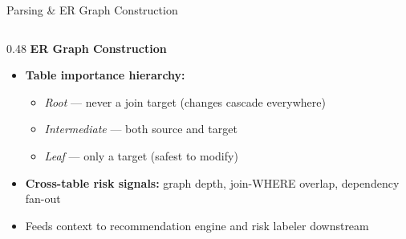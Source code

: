 \documentclass[10pt,aspectratio=169]{beamer}
\newcommand{\Raleway}{\sffamily}
\begin{document}
\begin{frame}{Parsing \& ER Graph Construction}
\begin{columns}[T]
    \begin{column}{0.48\textwidth}
      {\small\Raleway\bfseries\color{aggieblue} ER Graph Construction}\\[0.6em]
      \begin{itemize}
        \setlength{\itemsep}{0.6em}
        \item \textbf{Table importance hierarchy:}
          \begin{itemize}
            \setlength{\itemsep}{0.2em}
            \item \textit{Root} --- never a join target (changes cascade everywhere)
            \item \textit{Intermediate} --- both source and target
            \item \textit{Leaf} --- only a target (safest to modify)
          \end{itemize}
        \item \textbf{Cross-table risk signals:} graph depth, join-WHERE overlap, dependency fan-out
        \item Feeds context to recommendation engine and risk labeler downstream
      \end{itemize}
    \end{column}

  \end{columns}
\end{frame}

\end{document}

